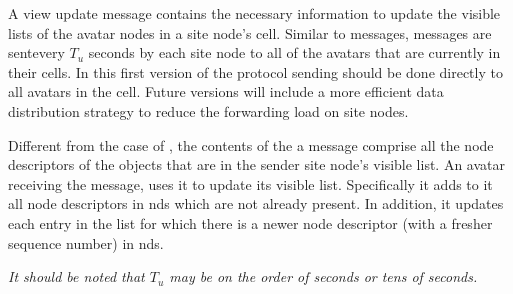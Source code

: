 A view update message contains the necessary information to update the
visible lists of the avatar nodes in a site node's cell. Similar to
\vupd messages, \snhb messages are sentevery $T_u$ seconds by each
site node to all of the avatars that are currently in their cells. In
this first version of the protocol sending should be done directly to
all avatars in the cell. Future versions will include a more efficient
data distribution strategy to reduce the forwarding load on site
nodes.  

Different from the case of \vupd, the contents of the a \snhb
message comprise all the node descriptors of the objects that are in
the sender site node's visible list. An avatar receiving the message,
uses it to update its visible list.  Specifically it adds to it all
node descriptors in nds which are not already present. In addition, it
updates each entry in the list for which there is a newer node
descriptor (with a fresher sequence number) in nds.

\emph{It should be noted that $T_{u}$ may be on the order of seconds
  or tens of seconds.}







